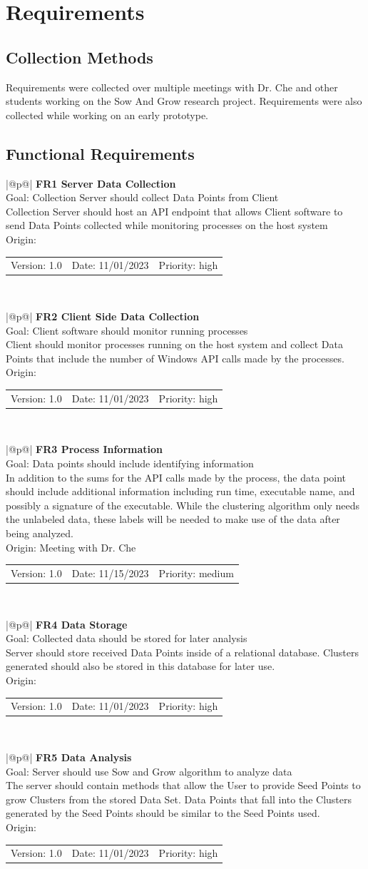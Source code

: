 \documentclass[titlepage]{article}
\makeatletter
\newcommand{\requirement}[7]
{
        \begin{table}[H]
            \centering
            \begin{tabular}{|@{}p{\textwidth}@{}|}
                \hline
                \textbf{#1} \\
                \hline
                Goal: #2 \\
                \hline
                #3 \\
                \hline
                Origin: #4 \\
                \hline
                \begin{tabular}{c|c|c}
                    Version: #5 & Date: #6 & Priority: #7\\
                \end{tabular}\\
            \hline
            \end{tabular}
        \end{table}
}
\makeatother
\begin{document}
\section{Requirements}


\subsection{Collection Methods}
Requirements were collected over multiple meetings with Dr. Che and other students working on the Sow And Grow research project. Requirements were also collected while working on an early prototype.
\subsection{Functional Requirements}


\requirement
{FR1 Server Data Collection}
{Collection Server should collect Data Points from Client }
{Collection Server should host an API endpoint that allows Client software to send Data Points collected while monitoring processes on the host system}
{}{1.0}{11/01/2023}{high}

\requirement
{FR2 Client Side Data Collection}
{Client software should monitor running processes}
{Client should monitor processes running on the host system and collect Data Points that include the number of Windows API calls made by the processes.}
{}{1.0}{11/01/2023}{high}

\requirement
{FR3 Process Information}
{Data points should include identifying information}
{In addition to the sums for the API calls made by the process, the data point should include additional information including run time, executable name, and possibly a signature of the executable. While the clustering algorithm only needs the unlabeled data, these labels will be needed to make use of the data after being analyzed.}
{Meeting with Dr. Che}{1.0}{11/15/2023}{medium}

\requirement
{FR4 Data Storage}
{Collected data should be stored for later analysis}
{Server should store received Data Points inside of a relational database. Clusters generated should also be stored in this database for later use.}
{}{1.0}{11/01/2023}{high}

\requirement
{FR5 Data Analysis}
{Server should use Sow and Grow algorithm to analyze data}
{The server should contain methods that allow the User to provide Seed Points to grow Clusters from the stored Data Set. Data Points that fall into the Clusters generated by the Seed Points should be similar to the Seed Points used.}
{}{1.0}{11/01/2023}{high}
\end{document}
